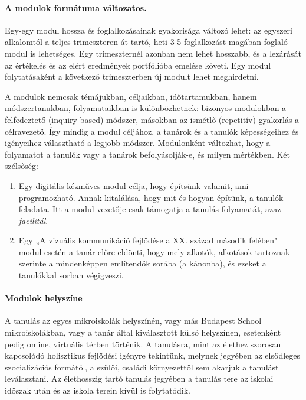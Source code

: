 \paragraph{A modulok formátuma változatos.}
Egy-egy modul hossza és foglalkozásainak gyakorisága változó lehet: az egyszeri alkalomtól a teljes trimeszteren át tartó, heti 3-5 foglalkozást magában foglaló modul is lehetséges. Egy trimeszternél azonban nem lehet hosszabb, és a lezárását az értékelés és az elért eredmények portfólióba emelése követi. Egy modul folytatásaként a következő trimeszterben új modult lehet meghirdetni.


A modulok nemcsak témájukban, céljaikban, időtartamukban, hanem módszertanukban, folyamataikban is különbözhetnek: bizonyos modulokban a felfedeztető (inquiry based) módszer, másokban az ismétlő (repetitív) gyakorlás a célravezető. Így mindig a modul céljához, a tanárok és a tanulók képességeihez és igényeihez választható a legjobb módszer. Modulonként változhat, hogy a folyamatot a tanulók vagy a tanárok befolyásolják-e, és milyen mértékben. Két szélsőség:
\begin{enumerate}
\item Egy digitális kézműves modul célja, hogy építsünk valamit, ami programozható. Annak kitalálása, hogy mit és hogyan építünk, a tanulók feladata. Itt a modul vezetője csak támogatja a tanulás folyamatát, azaz \emph{facilitál}.

\item Egy „A vizuális kommunikáció fejlődése a XX. század második felében" modul esetén a tanár előre eldönti, hogy mely alkotók, alkotások tartoznak szerinte a mindenképpen említendők sorába (a kánonba), és ezeket a tanulókkal sorban végigveszi.
\end{enumerate}

\paragraph {Modulok helyszíne}

A tanulás az egyes mikroiskolák helyszínén, vagy más Budapest School mikroiskolákban, vagy a tanár által kiválasztott külső helyszínen, esetenként pedig online, virtuális térben történik. A tanulásra, mint az élethez szorosan kapcsolódó holisztikus fejlődési igényre tekintünk, melynek jegyében az elsődleges szocializációs formától, a szülői, családi környezettől sem akarjuk a tanulást leválasztani. Az élethosszig tartó tanulás jegyében a tanulás tere az iskolai időszak után és az iskola terein kívül is folytatódik.


